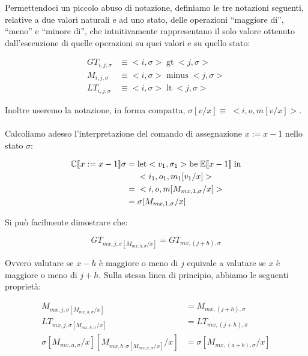     Permettendoci un piccolo abuso di notazione, definiamo le tre notazioni seguenti, relative a due valori naturali e ad uno stato, delle operazioni ``maggiore di'', ``meno'' e ``minore di'', che intuitivamente rappresentano il solo valore ottenuto dall'esecuzione di quelle operazioni su quei valori e su quello stato:
    
    \begin{align*}
        GT_{i,j,\sigma} &\equiv <i,\sigma>\; \mbox{gt}\; <j, \sigma>\\
        M_{i,j,\sigma} &\equiv <i,\sigma>\; \mbox{minus}\; <j, \sigma>\\
        LT_{i,j,\sigma} &\equiv <i,\sigma>\; \mbox{lt}\; <j, \sigma>
    \end{align*}
    
    Inoltre useremo la notazione, in forma compatta, $\sigma[v/x] \equiv\; <i,o,m[v/x]>$.\\
    \\
    Calcoliamo adesso l'interpretazione del comando di assegnazione $x:=x-1$ nello stato $\sigma$:
    
    \begin{align*}
        \mathbb{C}\llbracket x:=x-1 \rrbracket\sigma =\;& \mbox{let} <v_1,\sigma_1> \mbox{be}\; \mathbb{E}\llbracket x-1 \rrbracket\; \mbox{in}\\
        &<i_1,o_1,m_1[v_1/x]>\\
        =\;& <i,o,m[M_{mx,1,\sigma}/x]>\\
        =\;& \sigma[M_{mx,1,\sigma}/x]
    \end{align*}
    
    Si può facilmente dimostrare che:
    
    \begin{equation*}
        GT_{mx,j,\sigma[M_{mx,h,\sigma}/x]} = GT_{mx, (j+h), \sigma}
    \end{equation*}
    
    Ovvero valutare se $x-h$ è maggiore o meno di $j$ equivale a valutare se $x$ è maggiore o meno di $j+h$. Sulla stessa linea di principio, abbiamo le seguenti proprietà:
    
    \begin{align*}
        M_{mx,j,\sigma[M_{mx,h,\sigma}/x]} &= M_{mx, (j+h), \sigma}\\
        LT_{mx,j,\sigma[M_{mx,h,\sigma}/x]} &= LT_{mx, (j+h), \sigma}\\
        \sigma[M_{mx,a,\sigma}/x][M_{mx,b,\sigma[M_{mx,a,\sigma}/x]}/x] &= \sigma[M_{mx,(a+b),\sigma}/x]
    \end{align*}
    
